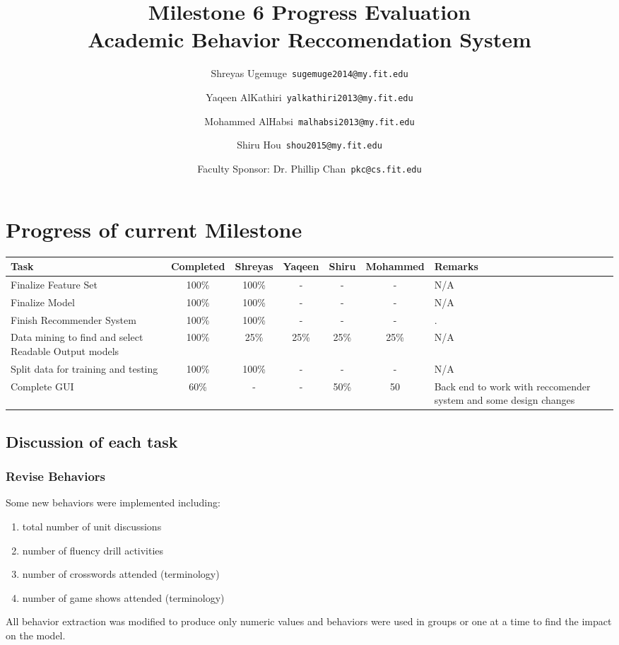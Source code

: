 \documentclass[12pt]{article}
\begin{document}
	\title{\textbf{Milestone 6 Progress Evaluation} \\ \hfill \break
	Academic Behavior Reccomendation System}
	\author{Shreyas Ugemuge\      \texttt{sugemuge2014@my.fit.edu}
  \and
  Yaqeen AlKathiri\      \texttt{yalkathiri2013@my.fit.edu}
  \and
	Mohammed AlHabsi\      \texttt{malhabsi2013@my.fit.edu}
  \and
  Shiru Hou\      \texttt{shou2015@my.fit.edu}
  \and
  Faculty Sponsor: Dr. Phillip Chan\      \texttt{pkc@cs.fit.edu}}
	\maketitle
	\pagebreak
	\singlespacing
	\tableofcontents
	\pagebreak
	\section{Progress of current Milestone}
	\begin{tabularx}{\textwidth}{|X|c|c|c|c|c|X|}
	\hline
		\textbf{Task} & \textbf{Completed} &\textbf{Shreyas} & \textbf{Yaqeen} & \textbf{Shiru} & \textbf{Mohammed} & \textbf{Remarks}  \\ \hline
			Finalize Feature Set &100\% & 100\% & - & - & - & N/A \\ \hline
			Finalize Model &100\% & 100\% & - & - & - & N/A \\ \hline
			Finish Recommender System & 100\% & 100\% & - & - & - & . \\ \hline
		Data mining to find and select Readable Output models & 100\% & 25\% & 25\% & 25\% & 25\% & N/A\\ \hline
		Split data for training and testing & 100\% & 100\% & - & - & - & N/A \\ \hline
		Complete GUI & 60\% & - & - & 50\% & 50 & Back end to work with reccomender system and some design changes \\ \hline
		
	\end{tabularx}
	\subsection{Discussion of each task}
	\subsubsection{Revise Behaviors}
	Some new behaviors were implemented including:
	\begin{enumerate}
		\item total number of unit discussions 
		\item number of fluency drill activities
		\item number of crosswords attended (terminology)
		\item number of game shows attended (terminology)
	\end{enumerate}
	All behavior extraction was modified to produce only numeric values and behaviors were used in groups or one at a time to find the impact on the model.
\end{document}
